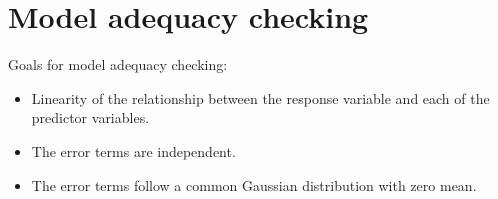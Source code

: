 \documentclass{article}
\begin{document}

%


\section{Model adequacy checking}
\setcounter{theorem}{0}

\vskip 0.3cm
\noindent Goals for model adequacy checking:
\begin{center}
\begin{minipage}{17cm}
\begin{itemize}
\item  Linearity of the relationship between the response variable and each of the predictor variables.
\item  The error terms are independent.
\item  The error terms follow a common Gaussian distribution with zero mean.
\end{itemize}
\end{minipage}
\end{center}
\end{document}
